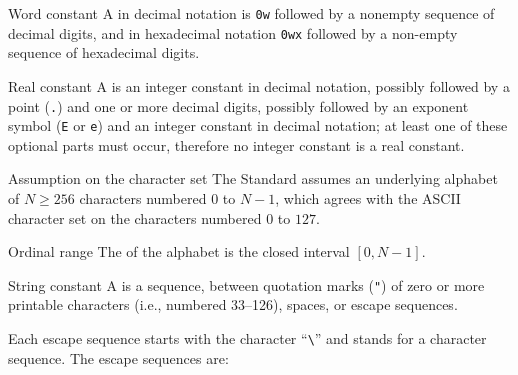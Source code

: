 \begin{definition}{Word constant}
A  in decimal notation is \texttt{0w} followed by
a nonempty sequence of decimal digits, and in hexadecimal notation
\texttt{0wx} followed by a non-empty sequence of hexadecimal digits.
\end{definition}

\begin{definition}{Real constant}
A  is an integer constant in decimal notation,
possibly followed by a point (\texttt{.}) and one or more decimal
digits, possibly followed by an exponent symbol (\texttt{E} or
\texttt{e}) and an integer constant in decimal notation; at least one of
these optional parts must occur, therefore no integer constant is a real
constant. 
\end{definition}

\begin{clause}{Assumption on the character set}
The Standard assumes an underlying alphabet of $N\geq256$ characters
numbered $0$ to $N-1$, which agrees with the ASCII character set on the
characters numbered $0$ to $127$.
\end{clause}

\begin{definition}{Ordinal range}
The  of the alphabet is the closed interval $[0,N-1]$.
\end{definition}

\begin{definition}{String constant}
A  is a sequence, between quotation marks (\texttt{"})
of zero or more printable characters (i.e., numbered 33--126), spaces,
or escape sequences.

Each escape sequence starts with the character ``\verb+\+'' and stands
for a character sequence. The escape sequences are:
\end{definition}

